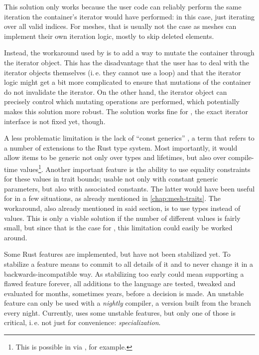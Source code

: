 This solution only works because the user code can reliably perform the same iteration the container's iterator would have performed: in this case, just iterating over all valid indices.
For meshes, that is usually not the case as meshes can implement their own iteration logic, mostly to skip deleted elements.

Instead, the workaround used by  is to add a way to mutate the container through the iterator object.
This has the disadvantage that the user has to deal with the iterator objects themselves (i.\,e. they cannot use a  loop) and that the iterator logic might get a bit more complicated to ensure that mutations of the container do not invalidate the iterator.
On the other hand, the iterator object can precisely control which mutating operations are performed, which potentially makes this solution more robust.
The solution works fine for , the exact iterator interface is not fixed yet, though.

\newpage

A less problematic limitation is the lack of \enquote{const generics} \cite{rfc2000}, a term that refers to a number of extensions to the Rust type system.
Most importantly, it would allow items to be generic not only over types and lifetimes, but also over compile-time values\footnote{This is possible in \cpp via , for example.}.
Another important feature is the ability to use equality constraints for these values in trait bounds; usable not only with constant generic parameters, but also with associated constants.
The latter would have been useful for  in a few situations, as already mentioned in \autoref{chap:mesh-traits}.
The workaround, also already mentioned in said section, is to use types instead of values.
This is only a viable solution if the number of different values is fairly small, but since that is the case for , this limitation could easily be worked around.

\vfill

Some Rust features are implemented, but have not been stabilized yet.
To stabilize a feature means to commit to all details of it and to never change it in a backwards-incompatible way.
As stabilizing too early could mean supporting a flawed feature forever, all additions to the language are tested, tweaked and evaluated for months, sometimes years, before a decision is made.
An unstable feature can only be used with a \emph{nightly} compiler, a version built from the  branch every night.
Currently,  uses some unstable features, but only one of those is critical, i.\,e. not just for convenience: \emph{specialization}.

